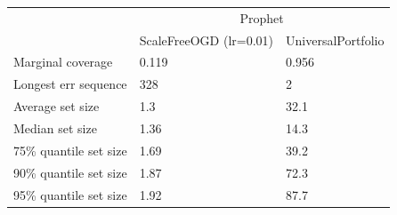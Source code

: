 \begin{tabular}{lll}
\toprule
& \multicolumn{2}{c}{Prophet} \\
& ScaleFreeOGD (lr=0.01) & UniversalPortfolio \\
\midrule
Marginal coverage & 0.119 & 0.956 \\
Longest err sequence & 328 & 2 \\
Average set size & 1.3 & 32.1 \\
Median set size & 1.36 & 14.3 \\
75\% quantile set size & 1.69 & 39.2 \\
90\% quantile set size & 1.87 & 72.3 \\
95\% quantile set size & 1.92 & 87.7 \\
\bottomrule
\end{tabular}
